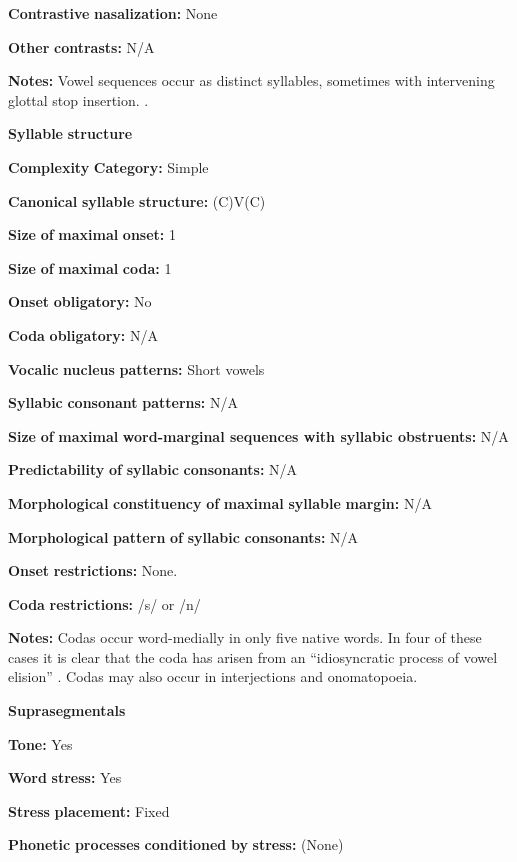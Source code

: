 \begin{styleBody}
\textbf{Contrastive} \textbf{nasalization:} None

\textbf{Other} \textbf{contrasts:} N/A

\textbf{Notes:} Vowel sequences occur as distinct syllables, sometimes with intervening glottal stop insertion. \citep[28-9]{Guillaume2008}.

\textbf{Syllable} \textbf{structure}

\textbf{Complexity} \textbf{Category:} Simple

\textbf{Canonical} \textbf{syllable} \textbf{structure:} (C)V(C) \citep[30-32]{Guillaume2008}

\textbf{Size} \textbf{of} \textbf{maximal} \textbf{onset:} 1

\textbf{Size} \textbf{of} \textbf{maximal} \textbf{coda:} 1

\textbf{Onset} \textbf{obligatory:} No

\textbf{Coda} \textbf{obligatory:} N/A

\textbf{Vocalic} \textbf{nucleus} \textbf{patterns:} Short vowels

\textbf{Syllabic} \textbf{consonant} \textbf{patterns:} N/A

\textbf{Size} \textbf{of} \textbf{maximal} \textbf{word{}-marginal sequences with syllabic obstruents:} N/A

\textbf{Predictability} \textbf{of} \textbf{syllabic} \textbf{consonants:} N/A

\textbf{Morphological} \textbf{constituency} \textbf{of} \textbf{maximal} \textbf{syllable} \textbf{margin:} N/A

\textbf{Morphological} \textbf{pattern} \textbf{of} \textbf{syllabic} \textbf{consonants:} N/A

\textbf{Onset} \textbf{restrictions:} None.

\textbf{Coda} \textbf{restrictions:} /s/ or /n/

\textbf{Notes:} Codas occur word-medially in only five native words. In four of these cases it is clear that the coda has arisen from an “idiosyncratic process of vowel elision” \citep[31]{Guillaume2008}. Codas may also occur in interjections and onomatopoeia.

\textbf{Suprasegmentals}

\textbf{Tone:} Yes

\textbf{Word} \textbf{stress:} Yes

\textbf{Stress} \textbf{placement:} Fixed

\textbf{Phonetic} \textbf{processes} \textbf{conditioned} \textbf{by} \textbf{stress:} (None)


\end{styleBody}
